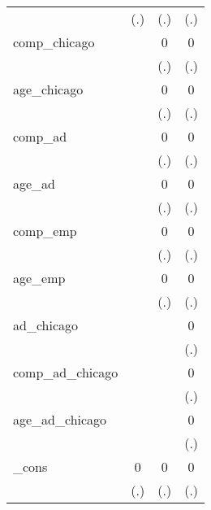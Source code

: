 {\begin{tabular}{l*{3}{c}}
            &         (.)         &         (.)         &         (.)         \\
[1em]
comp\_chicago&                     &           0         &           0         \\
            &                     &         (.)         &         (.)         \\
[1em]
age\_chicago &                     &           0         &           0         \\
            &                     &         (.)         &         (.)         \\
[1em]
comp\_ad     &                     &           0         &           0         \\
            &                     &         (.)         &         (.)         \\
[1em]
age\_ad      &                     &           0         &           0         \\
            &                     &         (.)         &         (.)         \\
[1em]
comp\_emp    &                     &           0         &           0         \\
            &                     &         (.)         &         (.)         \\
[1em]
age\_emp     &                     &           0         &           0         \\
            &                     &         (.)         &         (.)         \\
[1em]
ad\_chicago  &                     &                     &           0         \\
            &                     &                     &         (.)         \\
[1em]
comp\_ad\_chicago&                     &                     &           0         \\
            &                     &                     &         (.)         \\
[1em]
age\_ad\_chicago&                     &                     &           0         \\
            &                     &                     &         (.)         \\
[1em]
\_cons      &           0         &           0         &           0         \\
            &         (.)         &         (.)         &         (.)         \\

\end{tabular}}

